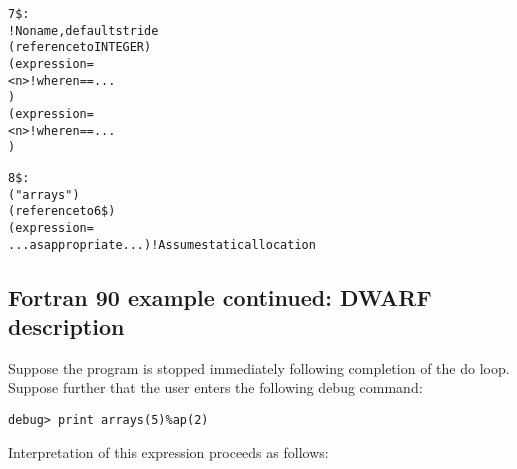 \begin{alltt}
7\$: 
        ! No name, default stride
        (reference to INTEGER)
        (expression=
            <n> ! where n == ...
            )
        (expression=
            <n> ! where n == ...
            )

8\$: 
        ("arrays")
        (reference to 6\$)
        (expression=
            ...as appropriate...) ! Assume static allocation
\end{alltt}

\subsection{Fortran 90 example continued: DWARF description}
\label{app:fortran90examplecontinueddwarfdescription}

Suppose 
the program is stopped immediately following completion
of the do loop. Suppose further that the user enters the
following debug command:

\begin{lstlisting}
debug> print arrays(5)%ap(2)
\end{lstlisting}

Interpretation of this expression proceeds as follows:

